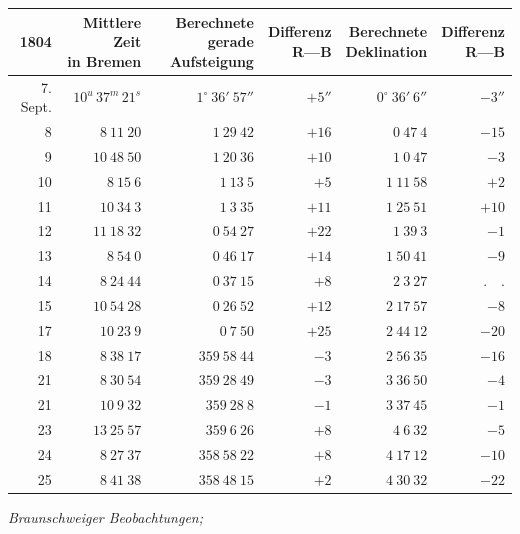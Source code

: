 \begin{center}
\begingroup\fontsize{8}{10}\selectfont\setlength{\tabcolsep}{3pt}\renewcommand{\arraystretch}{1.12}
\begin{tabular}{r|r|r|r|r|r}
1804 & \shortstack{Mittlere Zeit\\in Bremen} & \shortstack{Berechnete gerade\\Aufsteigung} & \shortstack{Differenz\\R—B} & \shortstack{Berechnete\\Deklination} & \shortstack{Differenz\\R—B} \\ \hline
7. Sept. & $10^{u}\,37^{m}\,21^{s}$ & $1^\circ\ 36'\ 57''$ & $+5''$ & $0^\circ\ 36'\ 6''$ & $-3''$ \\
8 & $8\ 11\ 20$ & $1\ 29\ 42$ & $+16$ & $0\ 47\ 4$ & $-15$ \\
9 & $10\ 48\ 50$ & $1\ 20\ 36$ & $+10$ & $1\ 0\ 47$ & $-3$ \\
10 & $8\ 15\ 6$ & $1\ 13\ 5$ & $+5$ & $1\ 11\ 58$ & $+2$ \\
11 & $10\ 34\ 3$ & $1\ 3\ 35$ & $+11$ & $1\ 25\ 51$ & $+10$ \\
12 & $11\ 18\ 32$ & $0\ 54\ 27$ & $+22$ & $1\ 39\ 3$ & $-1$ \\
13 & $8\ 54\ 0$ & $0\ 46\ 17$ & $+14$ & $1\ 50\ 41$ & $-9$ \\
14 & $8\ 24\ 44$ & $0\ 37\ 15$ & $+8$ & $2\ 3\ 27$ & $ .\quad . $ \\
15 & $10\ 54\ 28$ & $0\ 26\ 52$ & $+12$ & $2\ 17\ 57$ & $-8$ \\
17 & $10\ 23\ 9$ & $0\ 7\ 50$ & $+25$ & $2\ 44\ 12$ & $-20$ \\
18 & $8\ 38\ 17$ & $359\ 58\ 44$ & $-3$ & $2\ 56\ 35$ & $-16$ \\
21 & $8\ 30\ 54$ & $359\ 28\ 49$ & $-3$ & $3\ 36\ 50$ & $-4$ \\
21 & $10\ 9\ 32$ & $359\ 28\ 8$ & $-1$ & $3\ 37\ 45$ & $-1$ \\
23 & $13\ 25\ 57$ & $359\ 6\ 26$ & $+8$ & $4\ 6\ 32$ & $-5$ \\
24 & $8\ 27\ 37$ & $358\ 58\ 22$ & $+8$ & $4\ 17\ 12$ & $-10$ \\
25 & $8\ 41\ 38$ & $358\ 48\ 15$ & $+2$ & $4\ 30\ 32$ & $-22$ \\
\end{tabular}\endgroup
\end{center}

\begin{center}
\textit{Braunschweiger Beobachtungen;} 
\end{center}

